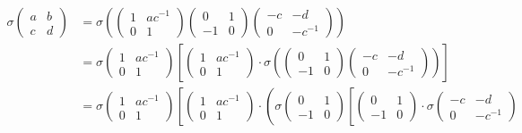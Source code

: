\begin{align}\label{fullsigma}
	\sigma\left(\begin{matrix}a & b\\c & d\end{matrix}\right)
	&=
	\sigma\left(
		\left(\begin{matrix}1 & ac^{-1}\\0 & 1\end{matrix}\right)
		\left(\begin{matrix}0 & 1\\-1 & 0\end{matrix}\right)
		\left(\begin{matrix}-c & -d\\0 & -c^{-1}\end{matrix}\right)
	\right) \nonumber \\
	&=
	\sigma\left(\begin{matrix}1 & ac^{-1}\\0 & 1\end{matrix}\right)\left[
		\left(\begin{matrix}1 & ac^{-1}\\0 & 1\end{matrix}\right)\cdot
	\sigma\left(
		\left(\begin{matrix}0 & 1\\-1 & 0\end{matrix}\right)
		\left(\begin{matrix}-c & -d\\0 & -c^{-1}\end{matrix}\right)
	\right)
	\right]\nonumber \\
	&=
	\sigma\left(\begin{matrix}1 & ac^{-1}\\0 & 1\end{matrix}\right)\left[
		\left(\begin{matrix}1 & ac^{-1}\\0 & 1\end{matrix}\right)\cdot
	\left(\sigma
		\left(\begin{matrix}0 & 1\\-1 & 0\end{matrix}\right)
		\left[
		\left(\begin{matrix}0 & 1\\-1 & 0\end{matrix}\right)\cdot
		\sigma\left(\begin{matrix}-c & -d\\0 & -c^{-1}\end{matrix}\right)

\end{align}
